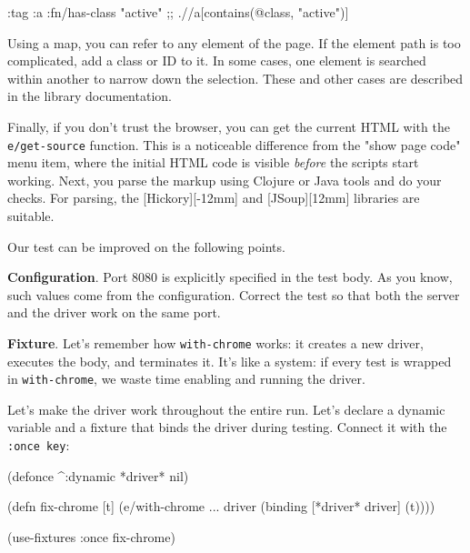 \begin{english}
  \begin{clojure}
{:tag :a :fn/has-class "active"}
;; .//a[contains(@class, "active")]
  \end{clojure}
\end{english}

Using a map, you can refer to any element of the page. If the element path is too complicated, add a class or ID to it. In some cases, one element is searched within another to narrow down the selection. These and other cases are described in the library documentation.

Finally, if you don't trust the browser, you can get the current HTML with the \verb|e/get-source| function. This is a noticeable difference from the "show page code" menu item, where the initial HTML code is visible \emph{before} the scripts start working. Next, you parse the markup using Clojure or Java tools and do your checks. For parsing, the [Hickory][-12mm] and [JSoup][12mm] libraries are suitable.


Our test can be improved on the following points.

\textbf{Configuration}. Port 8080 is explicitly specified in the test body. As you know, such values come from the configuration. Correct the test so that both the server and the driver work on the same port.


\textbf{Fixture}. Let's remember how \texttt{with-chrome} works: it creates a new driver, executes the body, and terminates it. It's like a system: if every test is wrapped in \verb|with-chrome|, we waste time enabling and running the driver.

Let's make the driver work throughout the entire run. Let's declare a dynamic variable and a fixture that binds the driver during testing. Connect it with the \verb|:once key|:

\begin{english}
  \begin{clojure}
(defonce ^:dynamic *driver* nil)

(defn fix-chrome [t]
  (e/with-chrome {...} driver
    (binding [*driver* driver]
      (t))))

(use-fixtures :once fix-chrome)
  \end{clojure}
\end{english}

